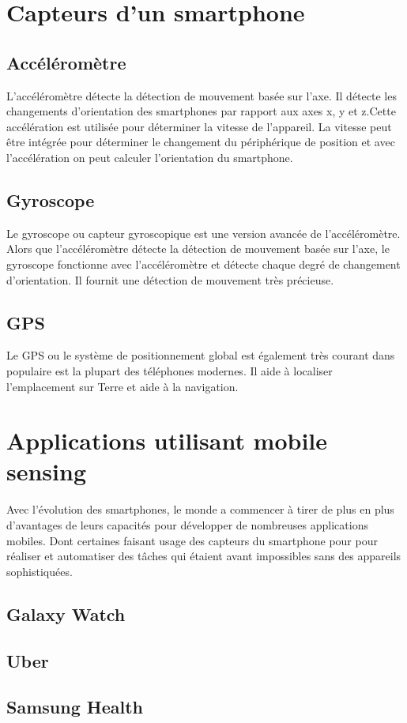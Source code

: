  \section{Capteurs d'un smartphone} 

 \subsection{Accéléromètre}
 L'accéléromètre détecte la détection de mouvement basée sur l'axe. Il détecte les changements d'orientation des smartphones par rapport aux axes x, y et z.Cette accélération est utilisée pour déterminer la vitesse de l’appareil. La vitesse peut être intégrée pour déterminer le changement du périphérique de position et avec l’accélération on peut calculer l’orientation du smartphone.

 \subsection{Gyroscope}
Le gyroscope ou capteur gyroscopique est une version avancée de l'accéléromètre. Alors que l'accéléromètre détecte la détection de mouvement basée sur l'axe, le gyroscope fonctionne avec l'accéléromètre et détecte chaque degré de changement d'orientation. Il fournit une détection de mouvement très précieuse.

\subsection{GPS}
Le GPS ou le système de positionnement global est également très courant dans populaire est la plupart des téléphones modernes. Il aide à localiser l'emplacement sur Terre et aide à la navigation.

\section{Applications utilisant mobile sensing}
Avec l'évolution des smartphones, le monde a commencer à tirer de plus en plus d'avantages de leurs capacités pour développer de nombreuses applications mobiles. Dont certaines faisant usage des capteurs du smartphone pour pour réaliser et automatiser des tâches qui étaient avant impossibles sans des appareils sophistiquées.
\subsection{Galaxy Watch}
\subsection{Uber}
\subsection{Samsung Health}